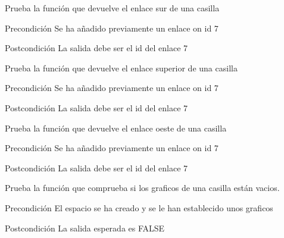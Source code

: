\begin{DoxyRefList}
\item[\label{test__test000289}%
\hypertarget{test__test000289}{}%
Global \hyperlink{space__test_8c_a8e345065f58565e131bdb3a9d0096ed5}{test1\-\_\-space\-\_\-get\-\_\-south} ()]Prueba la función que devuelve el enlace sur de una casilla \begin{DoxyPrecond}{Precondición}
Se ha añadido previamente un enlace on id 7 
\end{DoxyPrecond}
\begin{DoxyPostcond}{Postcondición}
La salida debe ser el id del enlace 7  
\end{DoxyPostcond}

\item[\label{test__test000298}%
\hypertarget{test__test000298}{}%
Global \hyperlink{space__test_8c_a27def98869466837b2b9e46c8979b795}{test1\-\_\-space\-\_\-get\-\_\-up} ()]Prueba la función que devuelve el enlace superior de una casilla \begin{DoxyPrecond}{Precondición}
Se ha añadido previamente un enlace on id 7 
\end{DoxyPrecond}
\begin{DoxyPostcond}{Postcondición}
La salida debe ser el id del enlace 7  
\end{DoxyPostcond}

\item[\label{test__test000295}%
\hypertarget{test__test000295}{}%
Global \hyperlink{space__test_8c_a1f08c6866885bfc093717f57b1b86539}{test1\-\_\-space\-\_\-get\-\_\-west} ()]Prueba la función que devuelve el enlace oeste de una casilla \begin{DoxyPrecond}{Precondición}
Se ha añadido previamente un enlace on id 7 
\end{DoxyPrecond}
\begin{DoxyPostcond}{Postcondición}
La salida debe ser el id del enlace 7  
\end{DoxyPostcond}

\item[\label{test__test000314}%
\hypertarget{test__test000314}{}%
Global \hyperlink{space__test_8c_af055a29d5e23debb5b9932d9c23b2555}{test1\-\_\-space\-\_\-graphics\-\_\-are\-Empty} ()]Prueba la función que comprueba si los graficos de una casilla están vacios. \begin{DoxyPrecond}{Precondición}
El espacio se ha creado y se le han establecido unos graficos 
\end{DoxyPrecond}
\begin{DoxyPostcond}{Postcondición}
La salida esperada es F\-A\-L\-S\-E  
\end{DoxyPostcond}


\end{DoxyRefList}
